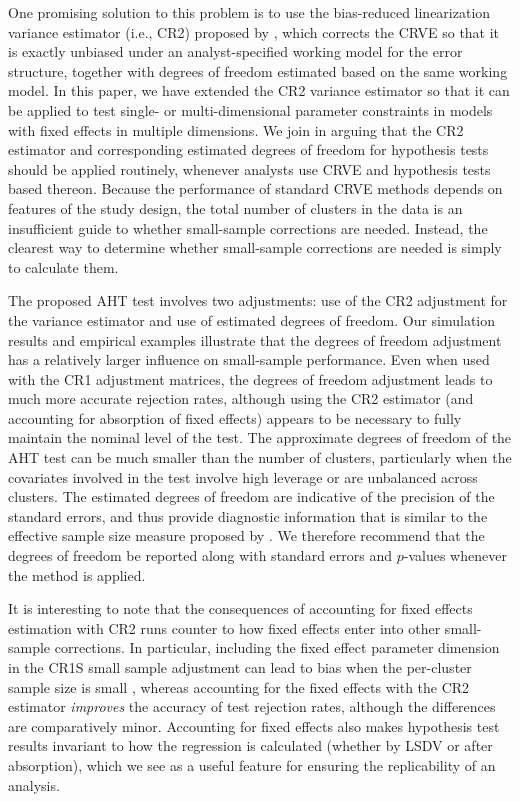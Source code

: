 \documentclass[12pt]{article}\usepackage[]{graphicx}\usepackage[]{color}
\begin{document}
One promising solution to this problem is to use the bias-reduced linearization variance estimator (i.e., CR2) proposed by \citet{Bell2002bias}, which corrects the CRVE so that it is exactly unbiased under an analyst-specified working model for the error structure, together with degrees of freedom estimated based on the same working model.
In this paper, we have extended the CR2 variance estimator so that it can be applied to test single- or multi-dimensional parameter constraints in models with fixed effects in multiple dimensions. 
We join \citet{Imbens2015robust} in arguing that the CR2 estimator and corresponding estimated degrees of freedom for hypothesis tests should be applied routinely, whenever analysts use CRVE and hypothesis tests based thereon. 
Because the performance of standard CRVE methods depends on features of the study design, the total number of clusters in the data is an insufficient guide to whether small-sample corrections are needed. 
Instead, the clearest way to determine whether small-sample corrections are needed is simply to calculate them.

The proposed AHT test involves two adjustments: use of the CR2 adjustment for the variance estimator and use of estimated degrees of freedom. 
Our simulation results and empirical examples illustrate that the degrees of freedom adjustment has a relatively larger influence on small-sample performance.
Even when used with the CR1 adjustment matrices, the degrees of freedom adjustment leads to much more accurate rejection rates, although using the CR2 estimator (and accounting for absorption of fixed effects) appears to be necessary to fully maintain the nominal level of the test. 
The approximate degrees of freedom of the AHT test can be much smaller than the number of clusters, particularly when the covariates involved in the test involve high leverage or are unbalanced across clusters.
The estimated degrees of freedom are indicative of the precision of the standard errors, and thus provide diagnostic information that is similar to the effective sample size measure proposed by \citet{Carter2013asymptotic}. 
We therefore recommend that the degrees of freedom be reported along with standard errors and $p$-values whenever the method is applied.

It is interesting to note that the consequences of accounting for fixed effects estimation with CR2 runs counter to how fixed effects enter into other small-sample corrections. 
In particular, including the fixed effect parameter dimension in the CR1S small sample adjustment can lead to bias when the per-cluster sample size is small \citep{Cameron2015practitioners}, whereas accounting for the fixed effects with the CR2 estimator \textit{improves} the accuracy of test rejection rates, although the differences are comparatively minor. 
Accounting for fixed effects also makes hypothesis test results invariant to how the regression is calculated (whether by LSDV or after absorption), which we see as a useful feature for ensuring the replicability of an analysis. 
\end{document}
